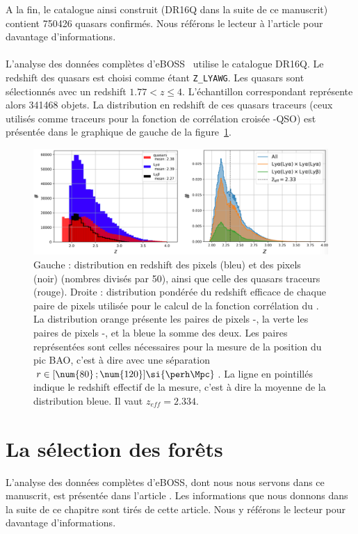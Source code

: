 A la fin, le catalogue ainsi construit (DR16Q dans la suite de ce manuscrit) contient \num{750426} quasars confirmés. Nous référons le lecteur à l'article \textcite{Lyke2020} pour davantage d'informations.



\paragraph{}
L'analyse \lya{} des données complètes d'eBOSS~\autocite{DuMasdesBourboux2020} utilise le catalogue DR16Q. Le redshift des quasars est choisi comme étant \texttt{Z\_LYAWG}. Les quasars sont sélectionnés avec un redshift $\num{1.77} < z \leq 4$. L'échantillon correspondant représente alors \num{341468} objets. La distribution en redshift de ces quasars traceurs (ceux utilisés comme traceurs pour la fonction de corrélation croisée \lya{}-QSO) est présentée dans le graphique de gauche de la figure~\ref{fig:pixel_number}.
\begin{figure}
  \centering
  \includegraphics[scale=0.4]{pixel_number}
  \caption{Gauche : distribution en redshift des pixels \lyalya{} (bleu) et des pixels\lyalyb{} (noir) (nombres divisés par 50), ainsi que celle des quasars traceurs (rouge). Droite : distribution pondérée du redshift efficace de chaque paire de pixels utilisée pour le calcul de la fonction corrélation du \lya{}. La distribution orange présente les paires de pixels \lyalya{}-\lyalya{}, la verte les paires de pixels \lyalya{}-\lyalyb{}, et la bleue la somme des deux. Les paires représentées sont celles nécessaires pour la mesure de la position du pic BAO, c'est à dire avec une séparation $r \in [\num{80} \,; \num{120}] \si{\perh\Mpc}$. La ligne en pointillés indique le redshift effectif de la mesure, c'est à dire la moyenne de la distribution bleue. Il vaut $z_{eff} = \num{2.334}$.}
  \label{fig:pixel_number}
\end{figure}


\section{La sélection des forêts}
\label{sec:selection_forets}
L'analyse \lya{} des données complètes d'eBOSS, dont nous nous servons dans ce manuscrit, est présentée dans l'article \textcite{DuMasdesBourboux2020}. Les informations que nous donnons dans la suite de ce chapitre sont tirés de cette article. Nous y référons le lecteur pour davantage d'informations.

